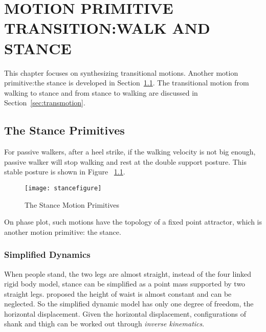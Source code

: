 
\chapter{MOTION PRIMITIVE TRANSITION:WALK AND STANCE}
\label{chap:stance}
    \graphicspath{{WalkStance/WalkStanceFigs/EPS/}{WalkStance/WalkStanceFigs/}}

This chapter focuses on synthesizing transitional motions.
Another motion primitive:the stance is developed in Section~\ref{sec:stanceprimitive}.
The transitional motion from walking to stance and from stance to walking are discussed in Section~\ref{sec:transmotion}.




    
    




\section{The Stance Primitives}
\label{sec:stanceprimitive}
For passive walkers, after a  heel strike, if the walking velocity is not big enough, passive walker will stop walking and rest at the double support posture.
This stable posture is shown in Figure ~\ref{fig:bipedalstance}.
\begin{figure}[!htbp]
  \begin{center}
     \texttt{[image: stancefigure]}
    \caption{The Stance Motion Primitives}
    \label{fig:bipedalstance}
\end{center}
\end{figure}

On phase plot, such motions have the topology of a fixed point attractor, which is  another motion primitive: the stance. 



\subsection{Simplified Dynamics}
When people stand, the two legs are almost straight,
instead of the four linked rigid body model, stance can be simplified as a point mass supported by two straight legs. 
\citet{stephens2009modeling} proposed the height of waist is almost constant and can be neglected.
So the simplified dynamic model has only one degree of freedom, the horizontal displacement.
Given the horizontal displacement, configurations of shank and thigh can be worked out through \emph{inverse kinematics}.
 




